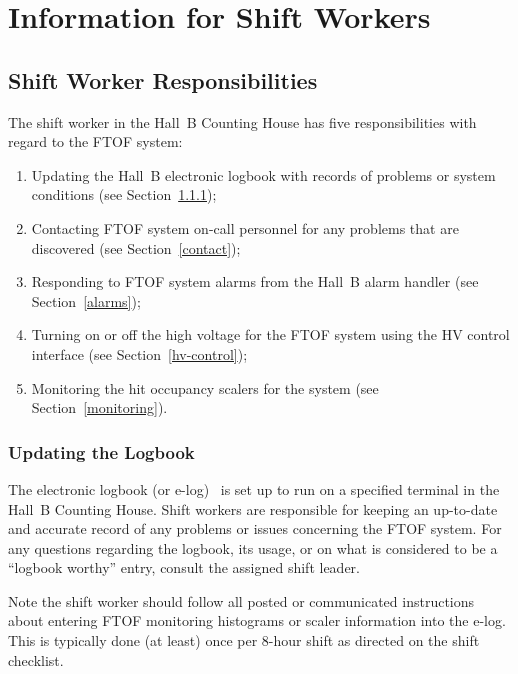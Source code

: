 \documentclass[12pt]{article}
\begin{document}
\clearpage

\vfil
\eject

\section{Information for Shift Workers}

\subsection{Shift Worker Responsibilities}

The shift worker in the Hall~B Counting House has five responsibilities with regard to 
the FTOF system:

\begin{enumerate}
\item Updating the Hall~B electronic logbook with records of problems or system 
conditions (see Section~\ref{logbook});

\item Contacting FTOF system on-call personnel for any problems that are discovered 
(see Section~\ref{contact});

\item Responding to FTOF system alarms from the Hall~B alarm handler (see 
Section~\ref{alarms});

\item Turning on or off the high voltage for the FTOF system using the HV control 
interface (see Section~\ref{hv-control});

\item Monitoring the hit occupancy scalers for the system (see Section~\ref{monitoring}).
\end{enumerate}

\subsubsection{Updating the Logbook}
\label{logbook}

The electronic logbook (or e-log)~\cite{e-log} is set up to run on a specified terminal 
in the Hall~B Counting House. Shift workers are responsible for keeping an up-to-date 
and accurate record of any problems or issues concerning the FTOF system. For any 
questions regarding the logbook, its usage, or on what is considered to be a ``logbook 
worthy'' entry, consult the assigned shift leader.

Note the shift worker should follow all posted or communicated instructions about 
entering FTOF monitoring histograms or scaler information into the e-log. This is
typically done (at least) once per 8-hour shift as directed on the shift checklist.
\end{document}
